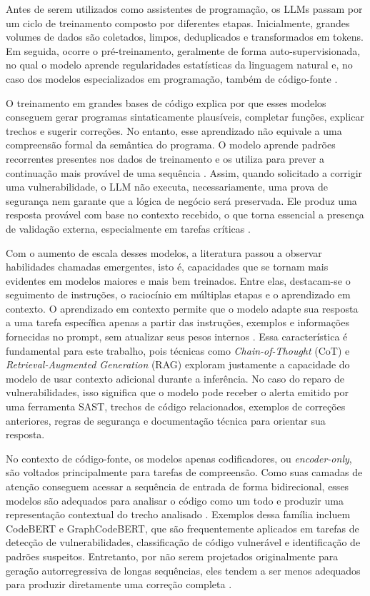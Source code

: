 Antes de serem utilizados como assistentes de programação, os LLMs passam por um ciclo de treinamento composto por diferentes etapas. Inicialmente, grandes volumes de dados são coletados, limpos, deduplicados e transformados em tokens. Em seguida, ocorre o pré-treinamento, geralmente de forma auto-supervisionada, no qual o modelo aprende regularidades estatísticas da linguagem natural e, no caso dos modelos especializados em programação, também de código-fonte \cite{minaee_large_2025}.

O treinamento em grandes bases de código explica por que esses modelos conseguem gerar programas sintaticamente plausíveis, completar funções, explicar trechos e sugerir correções. No entanto, esse aprendizado não equivale a uma compreensão formal da semântica do programa. O modelo aprende padrões recorrentes presentes nos dados de treinamento e os utiliza para prever a continuação mais provável de uma sequência \cite{minaee_large_2025}. Assim, quando solicitado a corrigir uma vulnerabilidade, o LLM não executa, necessariamente, uma prova de segurança nem garante que a lógica de negócio será preservada. Ele produz uma resposta provável com base no contexto recebido, o que torna essencial a presença de validação externa, especialmente em tarefas críticas \cite{sriram_improving_2026}.

Com o aumento de escala desses modelos, a literatura passou a observar habilidades chamadas emergentes, isto é, capacidades que se tornam mais evidentes em modelos maiores e mais bem treinados. Entre elas, destacam-se o seguimento de instruções, o raciocínio em múltiplas etapas e o aprendizado em contexto. O aprendizado em contexto permite que o modelo adapte sua resposta a uma tarefa específica apenas a partir das instruções, exemplos e informações fornecidas no prompt, sem atualizar seus pesos internos \cite{minaee_large_2025}. Essa característica é fundamental para este trabalho, pois técnicas como \textit{Chain-of-Thought} (CoT) e \textit{Retrieval-Augmented Generation} (RAG) exploram justamente a capacidade do modelo de usar contexto adicional durante a inferência. No caso do reparo de vulnerabilidades, isso significa que o modelo pode receber o alerta emitido por uma ferramenta SAST, trechos de código relacionados, exemplos de correções anteriores, regras de segurança e documentação técnica para orientar sua resposta.

No contexto de código-fonte, os modelos apenas codificadores, ou \textit{encoder-only}, são voltados principalmente para tarefas de compreensão. Como suas camadas de atenção conseguem acessar a sequência de entrada de forma bidirecional, esses modelos são adequados para analisar o código como um todo e produzir uma representação contextual do trecho analisado \cite{jiang_impact_2023}. Exemplos dessa família incluem CodeBERT e GraphCodeBERT, que são frequentemente aplicados em tarefas de detecção de vulnerabilidades, classificação de código vulnerável e identificação de padrões suspeitos. Entretanto, por não serem projetados originalmente para geração autorregressiva de longas sequências, eles tendem a ser menos adequados para produzir diretamente uma correção completa \cite{zhou_large_2024}.

